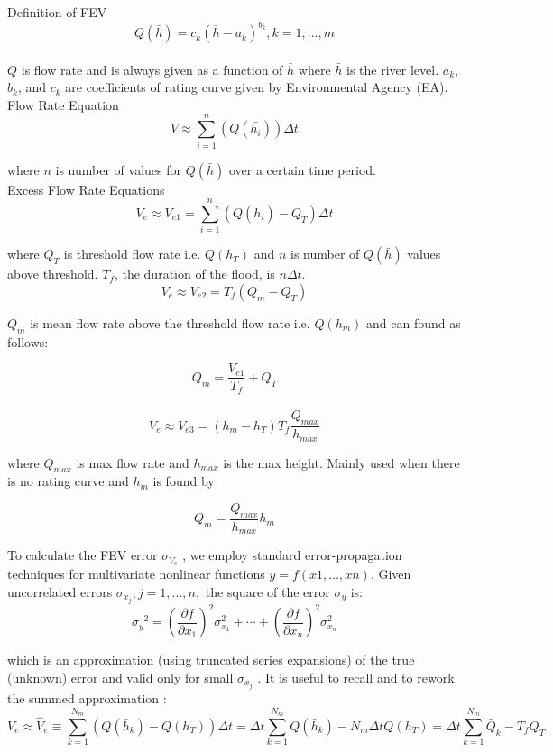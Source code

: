 Definition of FEV \\

$$Q(\bar{h})=c_k(\bar{h}-a_k)^{b_k}, k = 1,...,m$$ \\

$Q$ is flow rate and is always given as a function of $\bar{h}$ where $\bar{h}$ is the river level. $a_k$, $b_k$, and $c_k$ are coefficients of rating curve given by Environmental Agency (EA). \\

Flow Rate Equation\\

$$V \approx \sum_{i=1}^{n}(Q(\bar{h_i}))\Delta t$$

where $n$ is number of values for $Q(\bar{h})$ over a certain time period. \\

Excess Flow Rate Equations \\

$$V_e \approx V_{e1} = \sum_{i=1}^{n}(Q(\bar{h_i})-Q_T)\Delta t$$

where $Q_T$ is threshold flow rate i.e. $Q(h_T)$ and $n$ is number of $Q(\bar{h})$ values above threshold. $T_f$, the duration of the flood, is $n \Delta t$.\\

$$V_e \approx V_{e2} = T_f(Q_m-Q_T)$$

$Q_m$ is mean flow rate above the threshold flow rate i.e. $Q(h_m)$ and can found as follows:

$$Q_m = \frac{V_{e1}}{T_f}+Q_T$$ \\

$$V_e \approx V_{e3} = (h_m - h_T)T_f\frac{Q_{max}}{h_{max}}$$

where $Q_{max}$ is max flow rate and $h_{max}$ is the max height. Mainly used when there is no rating curve and $h_m$ is found by

$$Q_m = \frac{Q_{max}}{h_{max}}h_m$$


To calculate the FEV error $\sigma_{V_e}$ , we employ standard error-propagation techniques for multivariate nonlinear functions $y = f (x1, \ldots, xn)$. Given uncorrelated errors $\sigma_{x_j} , j = 1, \ldots, n,$ the square of the error $\sigma_y$ is:
\[{\sigma _{y}}^2=\left ( {\frac{\partial f}{\partial x_{1}}} \right )^2\sigma _{x_{1}}^2+\cdots+\left ( {\frac{\partial f}{\partial x_{n}}} \right )^2\sigma _{x_{n}}^2\]

which is an approximation (using truncated series expansions) of the true (unknown) error and valid only for small $\sigma_{x_j}$ . It is useful to recall and to rework the summed approximation :
\[V_{e}\approx \widehat{V}_{e}\equiv \sum_{k=1}^{N_{m}}\left(Q\left (\bar{h}_{k} \right )-Q\left (h_{T} \right ) \right )\Delta t=\Delta t\sum_{k=1}^{N_{m}} Q\left (\bar{h}_{k} \right )-N_{m}\Delta tQ\left ( h_{T} \right )= \Delta t\sum_{k=1}^{N_{m}}\bar{Q}_{k}-T_{f}Q_{T}\]

